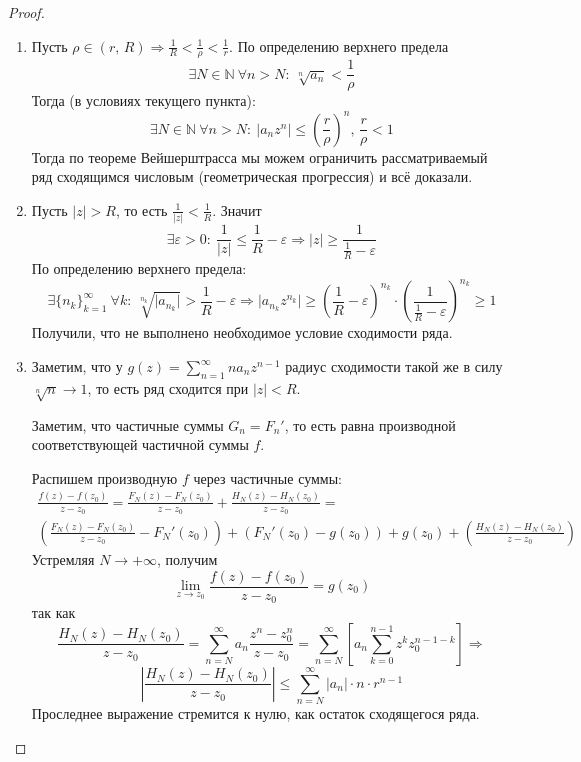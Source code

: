 \documentclass[a4paper,12pt]{article}
\renewcommand{\leq}{\ensuremath{\leqslant}}
\renewcommand{\geq}{\ensuremath{\geqslant}}
\theoremstyle{plain}
\theoremstyle{definition}
\theoremstyle{remark}
\begin{document}
\begin{proof}
	\begin{enumerate}
		\item Пусть $\rho \in (r,\, R) \Rightarrow \frac{1}{R} < \frac{1}{\rho} < \frac{1}{r}$. По определению верхнего предела
		      \[
			      \exists N \in \mathbb{N} \: \forall n > N :\: \sqrt[n]{a_n} < \frac{1}{\rho}
		      \]
		      Тогда (в условиях текущего пункта):
		      \[
			      \exists N \in \mathbb{N} \: \forall n > N :\: \vert a_nz^n\vert \leq \left(\frac{r}{\rho}\right)^n,\, \frac{r}{\rho} < 1
		      \]
		      Тогда по теореме Вейшерштрасса мы можем ограничить рассматриваемый ряд сходящимся числовым (геометрическая прогрессия) и всё доказали.
		\item Пусть $\vert z\vert > R$, то есть $\frac{1}{\vert z\vert} < \frac{1}{R}$. Значит
		      \[
			      \exists \varepsilon > 0 :\: \frac{1}{\vert z\vert} \leq \frac{1}{R} - \varepsilon \Rightarrow \vert z\vert \geq \frac{1}{\frac{1}{R} - \varepsilon}
		      \]
		      По определению верхнего предела:
		      \[
			      \exists \{n_k\}_{k = 1}^\infty \: \forall k :\: \sqrt[n_k]{\vert a_{n_k}\vert} > \frac{1}{R} - \varepsilon \Rightarrow \vert a_{n_k}z^{n_k}\vert \geq \left(\frac{1}{R} - \varepsilon\right)^{n_k}\cdot\left(\frac{1}{\frac{1}{R} - \varepsilon}\right)^{n_k} \geq 1
		      \]
		      Получили, что не выполнено необходимое условие сходимости ряда.
		\item Заметим, что у $g(z) = \sum_{n = 1}^\infty na_nz^{n-1}$ радиус сходимости такой же в силу $\sqrt[n]{n} \to 1$, то есть ряд сходится при $\vert z\vert < R$.

		      Заметим, что частичные суммы $G_n = F_n'$, то есть равна производной соответствующей частичной суммы $f$.

		      Распишем производную $f$ через частичные суммы:
		      \begin{align*}
			      \frac{f(z) - f(z_0)}{z - z_0} = \frac{F_N(z) - F_N(z_0)}{z - z_0} + \frac{H_N(z) - H_N(z_0)}{z - z_0} = \\
			      \left(\frac{F_N(z) - F_N(z_0)}{z - z_0}  - F_N'(z_0)\right) + (F_N'(z_0) - g(z_0)) + g(z_0) + \left(\frac{H_N(z) - H_N(z_0)}{z - z_0}\right)
		      \end{align*}
		      Устремляя $N \to +\infty$, получим
		      \[
			      \lim_{z \to z_0} \frac{f(z) - f(z_0)}{z - z_0} = g(z_0)
		      \]
		      так как
		      \[
			      \frac{H_N(z) - H_N(z_0)}{z - z_0} = \sum_{n = N}^\infty a_n\frac{z^n - z^n_0}{z - z_0} = \sum_{n = N}^\infty \left[a_n\sum_{k =0}^{n-1}z^kz_0^{n - 1 - k}\right] \Rightarrow
		      \]
		      \[
			      \left\vert\frac{H_N(z) - H_N(z_0)}{z - z_0}\right\vert \leq \sum_{n = N}^\infty \vert a_n\vert\cdot n\cdot r^{n - 1}
		      \]
		      Проследнее выражение стремится к нулю, как остаток сходящегося ряда.
	\end{enumerate}

\end{proof}
\end{document}

